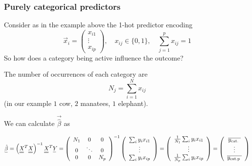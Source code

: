 \subsubsection{Purely categorical predictors}
Consider as in the example above the 1-hot predictor encoding
\begin{equation}
    \vec{x}_i = \begin{pmatrix}
        x_{i1} \\
        \vdots \\
        x_{ip}
    \end{pmatrix}, \quad x_{ij} \in \{0,1\}, \quad \sum_{j=1}^p x_{ij} = 1
\end{equation}
So how does a category being active influence the outcome?

The number of occurrences of each category are
\begin{equation}
    N_j = \sum_{i=1}^N x_{ij}
\end{equation}
(in our example $1$ cow, $2$ manatees, $1$ elephant).

We can calculate $\vec{\hat{\beta}}$ as

\begin{equation}
    \vec{\hat{\beta}}=\left(\mat{X}^T \mat{X}\right)^{-1} \mat{X}^T \vec{Y}=\left(\begin{array}{ccc}
    N_1 & 0 & 0 \\
    0 & \ddots & 0 \\
    0 & 0 & N_p
    \end{array}\right)^{-1}\left(\begin{array}{c}
    \sum_i y_i x_{i 1} \\
    \vdots \\
    \sum_i y_i x_{i p}
    \end{array}\right)=\left(\begin{array}{c}
    \frac{1}{N_1} \sum_i y_i x_{i 1} \\
    \vdots \\
    \frac{1}{N_p} \sum_i y_i x_{i p}
    \end{array}\right)=\left(\begin{array}{c}
    \overline{y_{\text {cat. }}} \\
    \vdots \\
    \overline{y_{\text {cat.p }}}
    \end{array}\right)
\end{equation}

